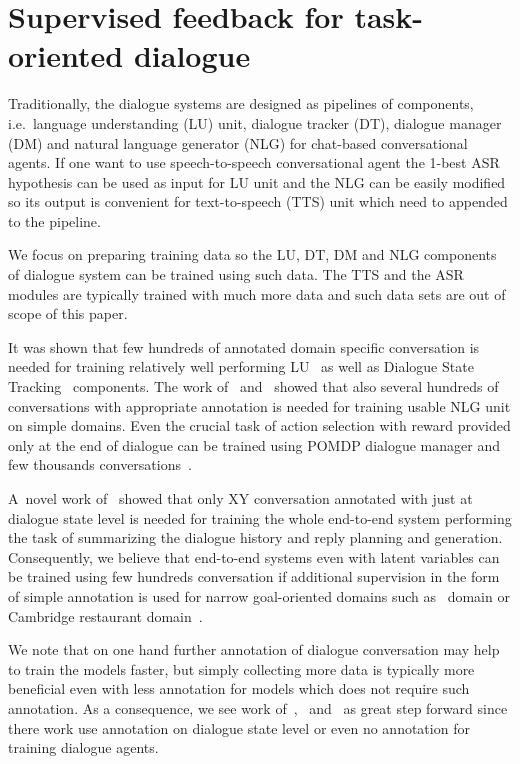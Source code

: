 \documentclass[runningheads,a4paper]{llncs}
\begin{document}
\section{Supervised feedback for task-oriented dialogue}
\label{sec:repre}
Traditionally, the dialogue systems are designed as pipelines of components, i.e.\ language understanding (LU) unit, dialogue tracker (DT), dialogue manager (DM) and natural language generator (NLG) for chat-based conversational agents.
If one want to use speech-to-speech conversational agent the 1-best ASR hypothesis can be used as input for LU unit and the NLG can be easily modified so its output is convenient for text-to-speech (TTS) unit which need to appended to the pipeline.

We focus on preparing training data so the LU, DT, DM and NLG components of dialogue system can be trained using such data.
The TTS and the ASR modules are typically trained with much more data and such data sets are out of scope of this paper.

It was shown that few hundreds of annotated domain specific conversation is needed for training relatively well performing LU~\cite{duvsek2014alex} as well as Dialogue State Tracking~\cite{young2010hidden} components.
The work of~\cite{duvsek2014alex} and~\cite{mairesse2010phrase} showed that also several hundreds of conversations with appropriate annotation is needed for training usable NLG unit on simple domains.
Even the crucial task of action selection with reward provided only at the end of dialogue can be trained using POMDP dialogue manager and few thousands conversations~\cite{gasic2011line}.

A~novel work of~\cite{wen2016network} showed that only XY conversation annotated with just at dialogue state level is needed for training the whole end-to-end system performing the task of summarizing the dialogue history and reply planning and generation.
Consequently, we believe that end-to-end systems even with latent variables can be trained using few hundreds conversation if additional supervision in the form of simple annotation is used for narrow goal-oriented domains such as~\cite{wen2016network} domain or Cambridge restaurant domain~\cite{henderson2014dstc2}.

We note that on one hand further annotation of dialogue conversation may help to train the models faster, but simply collecting more data is typically more beneficial even with less annotation for models which does not require such annotation.
As a consequence, we see work of~\cite{wen2016network},~\cite{bordes2016learning} and~\cite{williams2016end} as great step forward since there work use annotation on dialogue state level or even no annotation for training dialogue agents.
\end{document}
